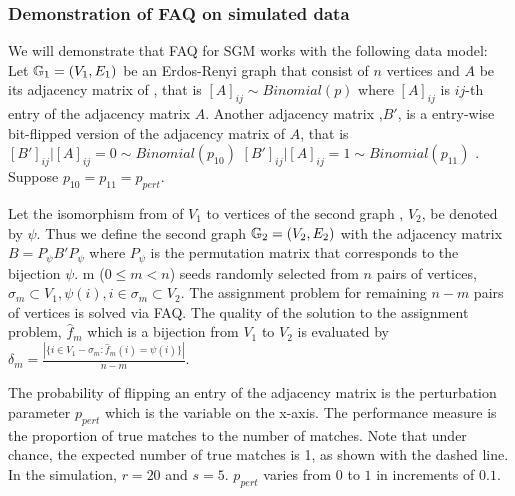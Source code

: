 \documentclass[12pt,oneside,final]{thesis}\usepackage[]{graphicx}\usepackage[]{color}
\begin{document}
\subsubsection{Demonstration of FAQ on simulated data\label{subsubsec:sgm_sim_results}}

We will demonstrate that  FAQ for SGM works with the following data model:
Let $\mathbb{G}_1=(V_1,E_1)$ be an Erdos-Renyi graph that consist of $n$ vertices and $A$ be its adjacency matrix of  ,  that is
  $\left[A\right]_{ij} \sim Binomial(p)$ where $\left[A\right]_{ij}$ is $ij$-th entry of the adjacency matrix  $A$. Another adjacency matrix  ,$B'$, is a entry-wise bit-flipped version of the adjacency matrix of $A$, that is
    $\left[B' \right]_{ij}|\left[A\right]_{ij}=0 \sim Binomial(p_{10})$ $\left[B'\right]_{ij}|\left[A\right]_{ij}=1 \sim Binomial(p_{11})$  . Suppose $p_{10}=p_{11}=p_{pert}$.
    
    Let the isomorphism from  of $V_1$ to vertices of the second graph , $V_2$, be denoted by $\psi$. Thus we define the second graph $\mathbb{G}_2=(V_2,E_2)$ with the adjacency matrix $B=P_{\psi}B'P_{\psi}$ where $P_{\psi}$ is the permutation matrix that corresponds to the bijection $\psi$. m ($0\leq m<n$) seeds randomly selected from $n$ pairs of vertices, $\sigma_m \subset V_1 , {\psi(i), i \in \sigma_m}\subset V_2 $. The assignment problem for remaining $n-m$ pairs of vertices is solved via FAQ. The quality of the solution to the assignment problem, $\hat{f}_m$ which is a bijection from  $V_1$ to  $V_2$ is evaluated  by  $\delta_m = \frac{|\{i\in V_1-\sigma_m: \hat{f}_m(i)=\psi(i)\}|}{n-m}$.
    
  The probability of flipping an entry of the adjacency matrix is the perturbation parameter $p_{pert}$ which is the variable on the x-axis. 
  The performance measure is the proportion of true matches to the number of matches. Note that 
  under chance, the expected number of true matches is 1, as shown with the dashed line. In the simulation, $r=20$ and $s=5$. $p_{pert}$ varies from $0$ to $1$ in increments of $0.1$. 
\end{document}

